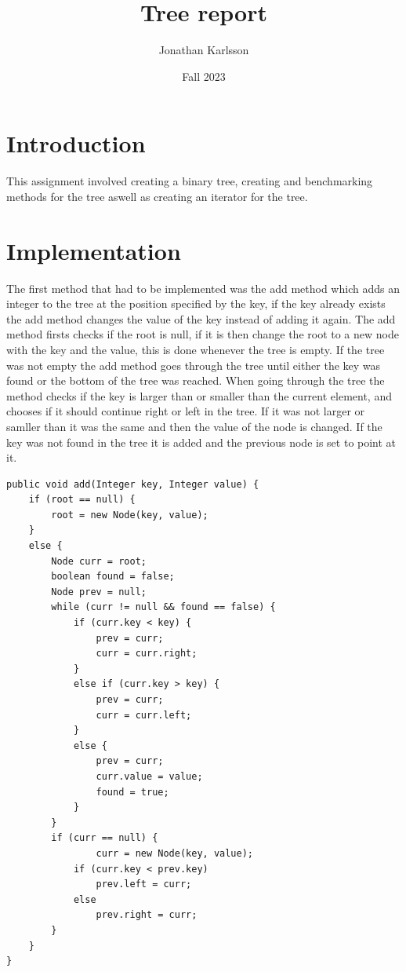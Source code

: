\documentclass[a4paper,11pt]{article}
\begin{document}
\title{
    \textbf{Tree report}
}
\author{Jonathan Karlsson}
\date{Fall 2023}

\maketitle

\section*{Introduction}
This assignment involved creating a binary tree, creating and benchmarking methods for the tree aswell as creating an iterator for the tree.
\section*{Implementation}
The first method that had to be implemented was the add method which adds an integer to the tree at the position specified by the key, if the key already exists the add method changes the value of the key instead of adding it again. 
The add method firsts checks if the root is null, if it is then change the root to a new node with the key and the value, this is done whenever the tree is empty. 
If the tree was not empty the add method goes through the tree until either the key was found or the bottom of the tree was reached. When going through the tree the method checks if the key is larger than or smaller than the current element, and chooses if it should 
continue right or left in the tree. If it was not larger or samller than it was the same and then the value of the node is changed. If the key was not found in the tree it is added and the previous node is set to point at it. 
\begin{verbatim}
public void add(Integer key, Integer value) {
    if (root == null) {
        root = new Node(key, value);
    } 
    else {
        Node curr = root;
        boolean found = false;
        Node prev = null;
        while (curr != null && found == false) {
            if (curr.key < key) {
                prev = curr;
                curr = curr.right;
            }
            else if (curr.key > key) {
                prev = curr;
                curr = curr.left;
            }                
            else {
                prev = curr;
                curr.value = value;
                found = true;
            }
        }
        if (curr == null) {
                curr = new Node(key, value);
            if (curr.key < prev.key)
                prev.left = curr;
            else
                prev.right = curr;
        }
    }
}
\end{verbatim}
\end{document}
